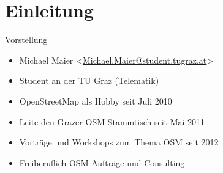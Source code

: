 \documentclass[handout]{beamer}
\begin{document}



\section{Einleitung}

\begin{frame}{Vorstellung}

  \begin{itemize}
    \item Michael Maier \textless \href{mailto:Michael.Maier@student.tugraz.at}{Michael.Maier@student.tugraz.at}\textgreater
    \item Student an der TU Graz (Telematik)
\vspace{0.3cm}
    \item OpenStreetMap als Hobby seit Juli 2010
    \item Leite den Grazer OSM-Stammtisch seit Mai 2011
\vspace{0.3cm}
    \item Vorträge und Workshops zum Thema OSM seit 2012
    \item Freiberuflich OSM-Aufträge und Consulting
  \end{itemize}
\end{frame}



\end{document}
